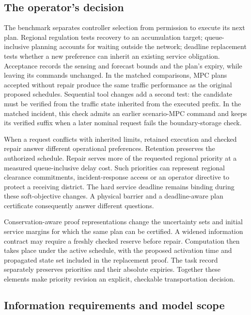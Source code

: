 \documentclass[journal,10pt]{IEEEtran}
\begin{document}
\subsection{The operator's decision}

The benchmark separates controller selection from permission to execute its
next plan. Regional regulation tests recovery to an accumulation target;
queue-inclusive planning accounts for waiting outside the network; deadline
replacement tests whether a new preference can inherit an existing service
obligation. Acceptance records the sensing and forecast bounds and the plan's expiry,
while leaving its commands unchanged. In the matched comparisons, MPC plans accepted without repair produce
the same traffic performance as the original proposed schedules.
Sequential tool changes add a second test: the candidate must be verified
from the traffic state inherited from the executed prefix. In the matched
incident, this check admits an earlier scenario-MPC command and keeps its
verified suffix when a later nominal request fails the boundary-storage check.

When a request conflicts with inherited limits, retained execution and
checked repair answer different operational preferences. Retention preserves
the authorized schedule. Repair serves more of the requested regional
priority at a measured queue-inclusive delay cost. Such priorities can
represent regional clearance commitments, incident-response access or an
operator directive to protect a receiving district. The hard service deadline
remains binding during these soft-objective changes. A physical barrier and
a deadline-aware plan certificate consequently answer different questions.

Conservation-aware proof representations change the uncertainty sets and
initial service margins for which the same plan can be certified. A widened
information contract may require a freshly checked reserve before repair.
Computation then takes place under the active schedule, with the proposed
activation time and propagated state set included in the replacement proof.
The task record separately preserves priorities and their absolute expiries.
Together these elements make priority revision an explicit, checkable
transportation decision.

\subsection{Information requirements and model scope}
\label{sec:information-model-scope}
\end{document}
